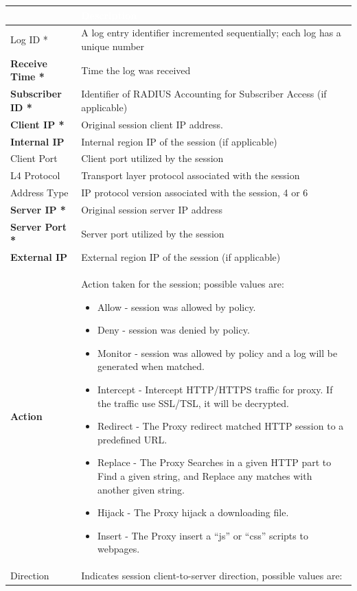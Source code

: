\begin{longtable}{p{}|p{}}   
    \rowcolor{black}\multicolumn{1}{l!\vlinewhite}{\textcolor{white}{Field}}  & \textcolor{white}{Description} \\\hline  
    Log ID * &	A log entry identifier incremented sequentially; each log has a unique number \\\hline
    \textbf{Receive Time *} &	Time the log was received \\\hline
    \textbf{Subscriber ID *} &	Identifier of RADIUS Accounting for Subscriber Access (if applicable) \\\hline
    \textbf{Client IP *} &	Original session client IP address. \\\hline
    \textbf{Internal IP} &	Internal region IP of the session (if applicable) \\\hline
    Client Port &	Client port utilized by the session \\\hline
    L4 Protocol &	Transport layer protocol associated with the session \\\hline
    Address Type &	IP protocol version associated with the session, 4 or 6 \\\hline
    \textbf{Server IP *} &	Original session server IP address \\\hline
    \textbf{Server Port *} &	Server port utilized by the session \\\hline
    \textbf{External IP} &	 External region IP of the session (if applicable) \\\hline
    \textbf{Action} &	Action taken for the session; possible values are:
                    \begin{itemize}
                        \item Allow - session was allowed by policy. 
                        \item Deny - session was denied by policy.  
                        \item Monitor - session was allowed by policy and a log will be generated when matched.
                        \item Intercept - Intercept HTTP/HTTPS traffic for proxy. If the traffic use SSL/TSL, it will be decrypted.  
                        \item Redirect - The Proxy redirect matched HTTP session to a predefined URL. 
                        \item Replace - The Proxy Searches in a given HTTP part to Find a given string, and Replace any matches with another given string.     
                        \item Hijack - The Proxy hijack a downloading file. 
                        \item Insert - The Proxy insert a “js” or “css” scripts to webpages. 
                    \end{itemize}
                 \\\hline
    Direction &	Indicates session client-to-server direction, possible values are:



\end{longtable}
